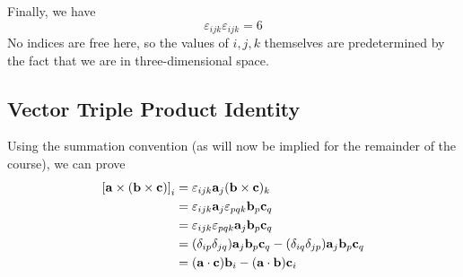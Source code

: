 Finally, we have
\[ \varepsilon_{ijk}\varepsilon_{ijk} = 6 \]
No indices are free here, so the values of $i, j, k$ themselves are predetermined by the fact that we are in three-dimensional space.

\subsection{Vector Triple Product Identity}
Using the summation convention (as will now be implied for the remainder of the course), we can prove
\begin{align*}
	\left[ \vb a \times (\vb b \times \vb c) \right]_i
	 & = \varepsilon_{ijk} \vb a_j (\vb b \times \vb c)_k                                                  \\
	 & = \varepsilon_{ijk} \vb a_j \varepsilon_{pqk} \vb b_p \vb c_q                                       \\
	 & = \varepsilon_{ijk}\varepsilon_{pqk} \vb a_j \vb b_p \vb c_q                                        \\
	 & = (\delta_{ip}\delta_{jq})\vb a_j \vb b_p \vb c_q - (\delta_{iq}\delta_{jp})\vb a_j \vb b_p \vb c_q \\
	 & = (\vb a \cdot \vb c) \vb b_i - (\vb a \cdot \vb b) \vb c_i
\end{align*}
